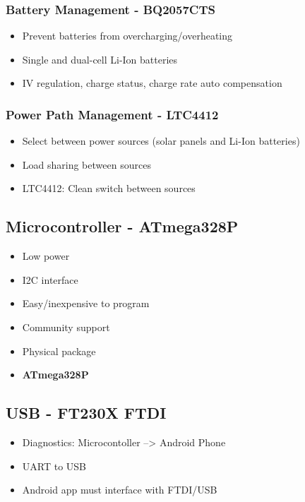 \documentclass{article}
\numberwithin{figure}{section}
\numberwithin{equation}{section}
\begin{document}
{\subsubsection{Battery Management - BQ2057CTS}
\begin{itemize}
    \item Prevent batteries from overcharging/overheating
    \item Single and dual-cell Li-Ion batteries
    \item IV regulation, charge status, charge rate auto compensation
\end{itemize}

\subsubsection{Power Path Management - LTC4412}
\begin{itemize}
    \item Select between power sources (solar panels and Li-Ion batteries)
    \item Load sharing between sources
    \item LTC4412: Clean switch between sources
\end{itemize}

\subsection{Microcontroller - ATmega328P}
\begin{itemize}
    \item Low power
    \item I2C interface
    \item Easy/inexpensive to program
    \item Community support
    \item Physical package
    \item \textbf{ATmega328P}
\end{itemize}

\subsection{USB - FT230X FTDI}
\begin{itemize}
    \item Diagnostics: Microcontoller --> Android Phone
    \item UART to USB
    \item Android app must interface with FTDI/USB
\end{itemize}

}
\end{document}
